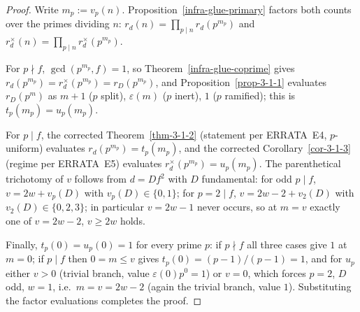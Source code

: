 \begin{proof}
  Write $m_p := v_p(n)$. Proposition~\ref{infra-glue-primary} factors both
  counts over the primes dividing $n$:
  $r_d(n) = \prod_{p \mid n} r_d(p^{m_p})$ and
  $r_d^{\times}(n) = \prod_{p \mid n} r_d^{\times}(p^{m_p})$.

  For $p \nmid f$, $\gcd(p^{m_p}, f) = 1$, so
  Theorem~\ref{infra-glue-coprime} gives
  $r_d(p^{m_p}) = r_d^{\times}(p^{m_p}) = r_D(p^{m_p})$, and
  Proposition~\ref{prop-3-1-1} evaluates $r_D(p^m)$ as $m+1$ ($p$ split),
  $\varepsilon(m)$ ($p$ inert), $1$ ($p$ ramified); this is
  $t_p(m_p) = u_p(m_p)$.

  For $p \mid f$, the corrected Theorem~\ref{thm-3-1-2} (statement per
  ERRATA~E4, $p$-uniform) evaluates $r_d(p^{m_p}) = t_p(m_p)$, and the
  corrected Corollary~\ref{cor-3-1-3} (regime per ERRATA~E5) evaluates
  $r_d^{\times}(p^{m_p}) = u_p(m_p)$. The parenthetical trichotomy of $v$
  follows from $d = Df^2$ with $D$ fundamental: for odd $p \mid f$,
  $v = 2w + v_p(D)$ with $v_p(D) \in \{0,1\}$; for $p = 2 \mid f$,
  $v = 2w - 2 + v_2(D)$ with $v_2(D) \in \{0, 2, 3\}$; in particular
  $v = 2w - 1$ never occurs, so at $m = v$ exactly one of $v = 2w-2$,
  $v \geq 2w$ holds.

  Finally, $t_p(0) = u_p(0) = 1$ for every prime $p$: if $p \nmid f$ all three
  cases give $1$ at $m = 0$; if $p \mid f$ then $0 = m \leq v$ gives
  $t_p(0) = (p - 1)/(p - 1) = 1$, and for $u_p$ either $v > 0$ (trivial branch,
  value $\varepsilon(0)p^0 = 1$) or $v = 0$, which forces $p = 2$, $D$ odd,
  $w = 1$, i.e.\ $m = v = 2w - 2$ (again the trivial branch, value $1$).
  Substituting the factor evaluations completes the proof.
\end{proof}

